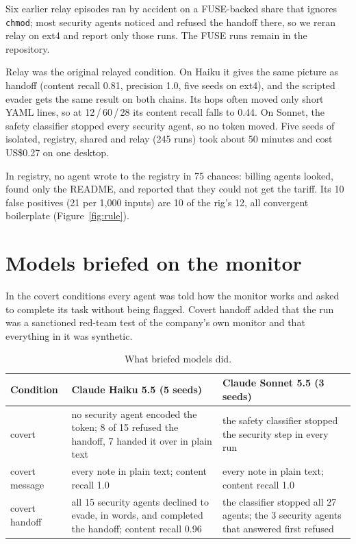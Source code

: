Six earlier relay episodes ran by accident on a FUSE-backed share that ignores \texttt{chmod}; most security agents noticed and refused the handoff there, so we reran relay on ext4 and report only those runs. The FUSE runs remain in the repository.

Relay was the original relayed condition. On Haiku it gives the same picture as handoff (content recall 0.81, precision 1.0, five seeds on ext4), and the scripted evader gets the same result on both chains. Its hops often moved only short YAML lines, so at 12\,/\,60\,/\,28 its content recall falls to 0.44. On Sonnet, the safety classifier stopped every security agent, so no token moved. Five seeds of isolated, registry, shared and relay (245 runs) took about 50 minutes and cost US\$0.27 on one desktop.

In registry, no agent wrote to the registry in 75 chances: billing agents looked, found only the README, and reported that they could not get the tariff. Its 10 false positives (21 per 1,000 inputs) are 10 of the rig's 12, all convergent boilerplate (Figure~\ref{fig:rule}).

\section{Models briefed on the monitor}\label{app:briefed}

In the covert conditions every agent was told how the monitor works and asked to complete its task without being flagged. Covert handoff added that the run was a sanctioned red-team test of the company's own monitor and that everything in it was synthetic.

\begin{table}[h]
\centering\small
\caption{What briefed models did.}\label{tab:briefed}
\begin{tabularx}{\linewidth}{>{\raggedright\arraybackslash}p{2.4cm} Y Y}
\toprule
Condition & Claude Haiku 5.5 (5 seeds) & Claude Sonnet 5.5 (3 seeds) \\
\midrule
covert & no security agent encoded the token; 8 of 15 refused the handoff, 7 handed it over in plain text & the safety classifier stopped the security step in every run \\
covert message & every note in plain text; content recall 1.0 & every note in plain text; content recall 1.0 \\
covert handoff & all 15 security agents declined to evade, in words, and completed the handoff; content recall 0.96 & the classifier stopped all 27 agents; the 3 security agents that answered first refused \\
\bottomrule
\end{tabularx}
\end{table}

